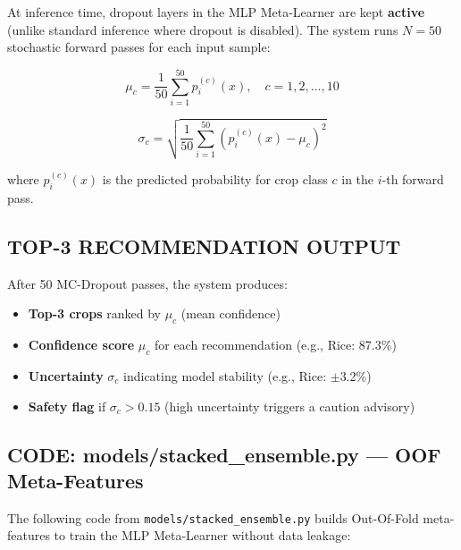 \documentclass[12pt,a4paper,oneside]{report}
\begin{document}
At inference time, dropout layers in the MLP Meta-Learner are kept \textbf{active} (unlike standard inference where dropout is disabled). The system runs $N = 50$ stochastic forward passes for each input sample:

\begin{equation}
\mu_c = \frac{1}{50}\sum_{i=1}^{50} p_i^{(c)}(x), \quad c = 1, 2, \ldots, 10
\end{equation}

\begin{equation}
\sigma_c = \sqrt{\frac{1}{50}\sum_{i=1}^{50}\left(p_i^{(c)}(x) - \mu_c\right)^2}
\end{equation}

where $p_i^{(c)}(x)$ is the predicted probability for crop class $c$ in the $i$-th forward pass.

\subsection{TOP-3 RECOMMENDATION OUTPUT}

After 50 MC-Dropout passes, the system produces:
\begin{itemize}[leftmargin=*, label=$\bullet$]
  \item \textbf{Top-3 crops} ranked by $\mu_c$ (mean confidence)
  \item \textbf{Confidence score} $\mu_c$ for each recommendation (e.g., Rice: 87.3\%)
  \item \textbf{Uncertainty} $\sigma_c$ indicating model stability (e.g., Rice: $\pm$3.2\%)
  \item \textbf{Safety flag} if $\sigma_c > 0.15$ (high uncertainty triggers a caution advisory)
\end{itemize}

\subsection{CODE: models/stacked\_ensemble.py --- OOF Meta-Features}

The following code from \texttt{models/stacked\_ensemble.py} builds Out-Of-Fold meta-features to train the MLP Meta-Learner without data leakage:
\end{document}
